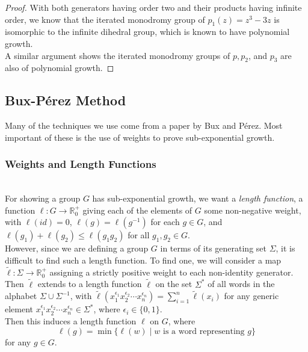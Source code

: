 \documentclass[11pt]{amsart}
\theoremstyle{definition}
\theoremstyle{remark}
\numberwithin{equation}{section}
\begin{document}
\begin{proof}
\indent With both generators having order two and their products having infinite order, we know that the iterated monodromy group of $p_1(z)=z^3-3z$ is isomorphic to the infinite dihedral group, which is known to have polynomial growth.\\
\indent A similar argument shows the iterated monodromy groups of $p,p_2$, and $p_3$ are also of polynomial growth. 

\end{proof}





















\subsection{Bux-P\'{e}rez Method}
Many of the techniques we use come from a paper by Bux and P\'{e}rez\cite{BuxP}. Most important of these is the use of weights to prove sub-exponential growth.\\

\subsubsection{Weights and Length Functions}\text{\space}\\

\indent For showing a group $G$ has sub-exponential growth, we want a \textit{length function}, a function $\ell: G\to \mathbb{R}_0^+$ giving each of the elements of $G$ some non-negative weight, with $\ell(id)=0$, $\ell(g)=\ell(g^{-1})$ for each $g\in G$, and $\ell(g_1)+\ell(g_2)\leq \ell(g_1g_2)$ for all $g_1,g_2\in G$.\\
\indent However, since we are defining a group $G$ in terms of its generating set $\Sigma$, it is difficult to find such a length function. To find one, we will consider a map $\tilde{\ell}:\Sigma\to \mathbb{R}_0^+$ assigning a strictly positive weight to each non-identity generator. Then $\tilde{\ell}$ extends to a length function $\tilde{\ell}$ on the set $\Sigma^*$ of all words in the alphabet $\Sigma\cup\Sigma^{-1}$, with $\displaystyle \tilde{\ell}(x_1^{\epsilon_1}x_2^{\epsilon_2}\cdots x_n^{\epsilon_n})=\sum_{i=1}^n\tilde{\ell}(x_i)$ for any generic element $x_1^{\epsilon_1}x_2^{\epsilon_2}\cdots x_n^{\epsilon_n}\in \Sigma^*$, where $\epsilon_i\in \{0,1\}$.\\
\indent Then this induces a length function $\ell$ on $G$, where $$\ell(g)=\min\{\ell(w)\mid w \textrm{ is a word representing } g\}$$ for any $g\in G$.\\
\end{document}
